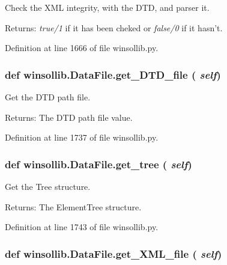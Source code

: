 Check the XML integrity, with the DTD, and parser it. 

\begin{Desc}
\item[Returns:]{\em true/1\/} if it has been cheked or {\em false/0\/} if it hasn't. \end{Desc}


Definition at line 1666 of file winsollib.py.\hypertarget{classwinsollib_1_1DataFile_180e6a2106958fc221b476ee5ea443cd}{
\subsubsection[get\_\-DTD\_\-file]{\setlength{\rightskip}{0pt plus 5cm}def winsollib.Data\-File.get\_\-DTD\_\-file ( {\em self})}}
\label{classwinsollib_1_1DataFile_180e6a2106958fc221b476ee5ea443cd}


Get the DTD path file. 

\begin{Desc}
\item[Returns:]The DTD path file value. \end{Desc}


Definition at line 1737 of file winsollib.py.\hypertarget{classwinsollib_1_1DataFile_f9deb4c156634e7b17f945142493897b}{
\subsubsection[get\_\-tree]{\setlength{\rightskip}{0pt plus 5cm}def winsollib.Data\-File.get\_\-tree ( {\em self})}}
\label{classwinsollib_1_1DataFile_f9deb4c156634e7b17f945142493897b}


Get the Tree structure. 

\begin{Desc}
\item[Returns:]The Element\-Tree structure. \end{Desc}


Definition at line 1743 of file winsollib.py.\hypertarget{classwinsollib_1_1DataFile_d170e6164cbd6ecc3368a74e7e21ad2f}{
\subsubsection[get\_\-XML\_\-file]{\setlength{\rightskip}{0pt plus 5cm}def winsollib.Data\-File.get\_\-XML\_\-file ( {\em self})}}
\label{classwinsollib_1_1DataFile_d170e6164cbd6ecc3368a74e7e21ad2f}


